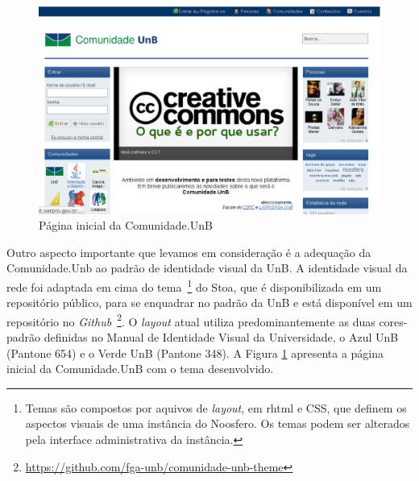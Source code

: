 \begin{figure}[h]
	\centering
	\includegraphics[keepaspectratio=true,scale=0.4]
	  {figuras/comunidade.unb.br.eps}
	\caption{Página inicial da Comunidade.UnB}
	\label{comunidade-unb}
\end{figure}

Outro aspecto importante que levamos em consideração é a adequação da
Comunidade.Unb ao padrão de identidade visual da UnB.
A identidade visual da rede foi adaptada em cima do tema~\footnote{Temas são
compostos por aquivos de \textit{layout}, em rhtml e CSS, que definem os aspectos
visuais de uma instância do Noosfero. Os temas podem ser alterados pela interface
administrativa da instância.} do Stoa, que é disponibilizada em um repositório
público, para se enquadrar no padrão da UnB e está disponível em um repositório
no \textit{Github}~\footnote{\url{https://github.com/fga-unb/comunidade-unb-theme}}.
%
O \textit{layout} atual utiliza predominantemente as duas cores-padrão definidas
no Manual de Identidade Visual da Universidade\cite{visualUnB}, o Azul UnB
(Pantone 654) e o Verde UnB (Pantone 348). A Figura \ref{comunidade-unb}
apresenta a página inicial da Comunidade.UnB com o tema desenvolvido.
